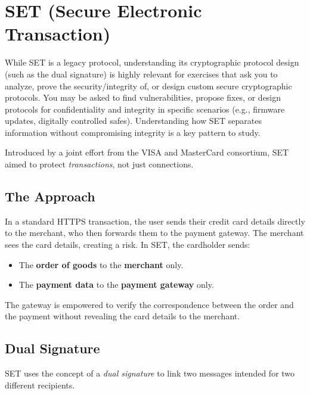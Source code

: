 \section{SET (Secure Electronic Transaction)}

\begin{tcolorbox}[colback=blue!5!white,colframe=blue!75!black,title=Exam Insight]
While SET is a legacy protocol, understanding its cryptographic protocol design (such as the dual signature) is highly relevant for exercises that ask you to analyze, prove the security/integrity of, or design custom secure cryptographic protocols. You may be asked to find vulnerabilities, propose fixes, or design protocols for confidentiality and integrity in specific scenarios (e.g., firmware updates, digitally controlled safes). Understanding how SET separates information without compromising integrity is a key pattern to study.
\end{tcolorbox}

Introduced by a joint effort from the VISA and MasterCard consortium, SET aimed to protect \textit{transactions}, not just connections. 

\subsection{The Approach}
In a standard HTTPS transaction, the user sends their credit card details directly to the merchant, who then forwards them to the payment gateway. The merchant sees the card details, creating a risk.
In SET, the cardholder sends:
\begin{itemize}
    \item The \textbf{order of goods} to the \textbf{merchant} only.
    \item The \textbf{payment data} to the \textbf{payment gateway} only.
\end{itemize}
The gateway is empowered to verify the correspondence between the order and the payment without revealing the card details to the merchant.

\subsection{Dual Signature}
SET uses the concept of a \textit{dual signature} to link two messages intended for two different recipients.

